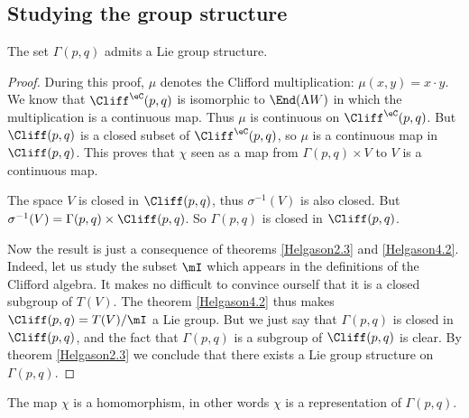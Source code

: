 \subsection{Studying the group structure}

\begin{proposition}
The set $\Gamma(p,q)$ admits a Lie group structure.
\end{proposition}
\begin{proof}

During this proof, $\mu$ denotes the Clifford multiplication: $\mu(x,y)=x\cdot y$. We know that $\Cliff^{\eC}(p,q)$ is isomorphic to $\End(\Lambda W)$ in which the multiplication is a continuous map. Thus $\mu$ is continuous on $\Cliff^{\eC}(p,q)$. But $\Cliff(p,q)$ is a closed subset of $\Cliff^{\eC}(p,q)$, so $\mu$ is a continuous map in $\Cliff(p,q)$. This proves that  $\chi$ seen as a map from $\Gamma(p,q)\times V$ to $V$ is a continuous map.

The space $V$ is closed in $\Cliff(p,q)$, thus $\sigma^{-1}(V)$ is also closed. But $\sigma^{-1}(V)=\Gamma(p,q)\times\Cliff(p,q)$. So $\Gamma(p,q)$ is closed in $\Cliff(p,q)$.

Now the result is just a consequence of theorems \ref{Helgason2.3} and \ref{Helgason4.2}. Indeed, let us study the subset $\mI$ which appears in the definitions of the Clifford algebra. It makes no difficult to convince ourself that it is a closed subgroup of $T(V)$. The theorem \ref{Helgason4.2} thus makes $\Cliff(p,q)=T(V)/\mI$ a Lie group. But we just say that $\Gamma(p,q)$ is closed in $\Cliff(p,q)$, and the fact that $\Gamma(p,q)$ is a subgroup of $\Cliff(p,q)$ is clear. By theorem \ref{Helgason2.3} we conclude that there exists a Lie group structure on $\Gamma(p,q)$.
\end{proof}

\begin{lemma}
The map $\chi$ is a homomorphism, in other words $\chi$ is a representation of $\Gamma(p,q)$.
\end{lemma}

